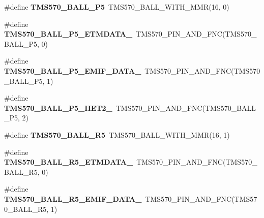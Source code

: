 \begin{DoxyCompactItemize}
\mbox{\label{tms570lc4357-pins_8h_a8acb159c2faad0fc2993a4e944e5c9f6}} 
\#define {\bfseries T\+M\+S570\+\_\+\+B\+A\+L\+L\+\_\+\+P5}~T\+M\+S570\+\_\+\+B\+A\+L\+L\+\_\+\+W\+I\+T\+H\+\_\+\+M\+MR(16, 0)
\item 
\mbox{\label{tms570lc4357-pins_8h_aa27d2bdc8305e2074e16a2f9698d8e56}} 
\#define {\bfseries T\+M\+S570\+\_\+\+B\+A\+L\+L\+\_\+\+P5\+\_\+\+E\+T\+M\+D\+A\+T\+A\+\_}~T\+M\+S570\+\_\+\+P\+I\+N\+\_\+\+A\+N\+D\+\_\+\+F\+NC(T\+M\+S570\+\_\+\+B\+A\+L\+L\+\_\+\+P5, 0)
\item 
\mbox{\label{tms570lc4357-pins_8h_afbc192ce7f0848df50223fc646415f9c}} 
\#define {\bfseries T\+M\+S570\+\_\+\+B\+A\+L\+L\+\_\+\+P5\+\_\+\+E\+M\+I\+F\+\_\+\+D\+A\+T\+A\+\_}~T\+M\+S570\+\_\+\+P\+I\+N\+\_\+\+A\+N\+D\+\_\+\+F\+NC(T\+M\+S570\+\_\+\+B\+A\+L\+L\+\_\+\+P5, 1)
\item 
\mbox{\label{tms570lc4357-pins_8h_a7062fdfe6c81b1134a8fa6d74246eb55}} 
\#define {\bfseries T\+M\+S570\+\_\+\+B\+A\+L\+L\+\_\+\+P5\+\_\+\+H\+E\+T2\+\_}~T\+M\+S570\+\_\+\+P\+I\+N\+\_\+\+A\+N\+D\+\_\+\+F\+NC(T\+M\+S570\+\_\+\+B\+A\+L\+L\+\_\+\+P5, 2)
\item 
\mbox{\label{tms570lc4357-pins_8h_aa369dda2adcaa59dedd07046ec3ff23a}} 
\#define {\bfseries T\+M\+S570\+\_\+\+B\+A\+L\+L\+\_\+\+R5}~T\+M\+S570\+\_\+\+B\+A\+L\+L\+\_\+\+W\+I\+T\+H\+\_\+\+M\+MR(16, 1)
\item 
\mbox{\label{tms570lc4357-pins_8h_a737397d8aee82130951039e3d1be7605}} 
\#define {\bfseries T\+M\+S570\+\_\+\+B\+A\+L\+L\+\_\+\+R5\+\_\+\+E\+T\+M\+D\+A\+T\+A\+\_}~T\+M\+S570\+\_\+\+P\+I\+N\+\_\+\+A\+N\+D\+\_\+\+F\+NC(T\+M\+S570\+\_\+\+B\+A\+L\+L\+\_\+\+R5, 0)
\item 
\mbox{\label{tms570lc4357-pins_8h_a470a025def4f69b68b02693228a0eb67}} 
\#define {\bfseries T\+M\+S570\+\_\+\+B\+A\+L\+L\+\_\+\+R5\+\_\+\+E\+M\+I\+F\+\_\+\+D\+A\+T\+A\+\_}~T\+M\+S570\+\_\+\+P\+I\+N\+\_\+\+A\+N\+D\+\_\+\+F\+NC(T\+M\+S570\+\_\+\+B\+A\+L\+L\+\_\+\+R5, 1)
\item 
\mbox{\label{tms570lc4357-pins_8h_aa572891ea5f4fa481e0d59aec79c0799}} 

\end{DoxyCompactItemize}
